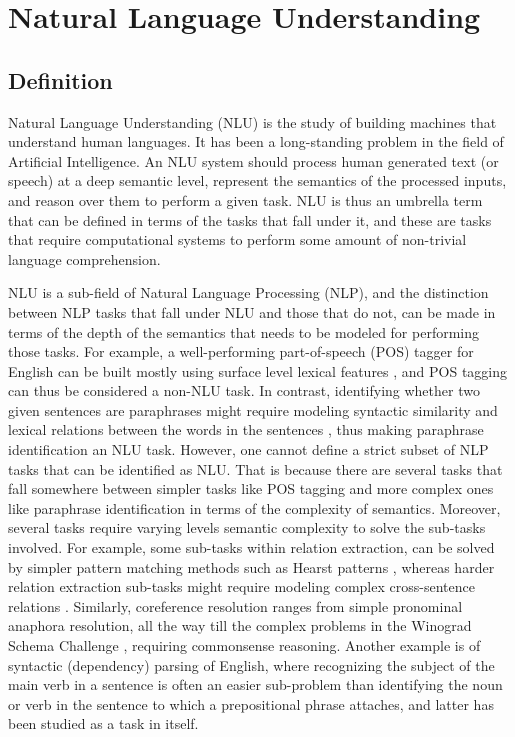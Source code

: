 \section{Natural Language Understanding} \subsection{Definition} Natural Language Understanding
(NLU) is the study of building machines that understand human languages. It has been a long-standing
problem in the field of Artificial Intelligence. An NLU system should process human generated text
(or speech) at a deep semantic level, represent the semantics of the processed inputs, and reason
over them to perform a given task. NLU is thus an umbrella term that can be defined in terms of the
tasks that fall under it, and these are tasks that require computational systems to perform some
amount of non-trivial language comprehension.

NLU is a sub-field of Natural Language Processing (NLP), and the distinction between NLP tasks that
fall under NLU and those that do not, can be made in terms of the depth of the semantics that needs
to be modeled for performing those tasks.  For example, a well-performing part-of-speech (POS)
tagger for English can be built mostly using surface level lexical features
\citep{toutanova2003feature}, and POS tagging can thus be considered a non-NLU task. In contrast,
identifying whether two given sentences are paraphrases might require modeling syntactic similarity
and lexical relations between the words in the sentences \citep{das2009paraphrase}, thus making
paraphrase identification an NLU task. However, one cannot define a strict subset of NLP tasks that
can be identified as NLU\@. That is because there are several tasks that fall somewhere between
simpler tasks like POS tagging and more complex ones like paraphrase identification in terms of the
complexity of semantics.  Moreover, several tasks require varying levels semantic complexity to
solve the sub-tasks involved.
For example, some sub-tasks within relation extraction, can be solved by simpler pattern matching
methods such as Hearst patterns \citep{hearst1992automatic}, whereas harder relation extraction  
sub-tasks might require modeling complex cross-sentence relations \citep{peng2017cross}.
Similarly, coreference resolution ranges from simple pronominal anaphora resolution, all the way till
the complex problems in the Winograd Schema Challenge \citep{levesque2012winograd}, requiring
commonsense reasoning. Another example is of syntactic (dependency) parsing of English, where recognizing
the subject of the main verb in a sentence is often an easier sub-problem than identifying the noun or
verb in the sentence to which a prepositional phrase attaches, and latter has been studied as a task
in itself.

